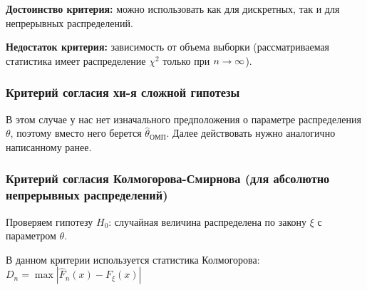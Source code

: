 \documentclass[11pt]{article}
\def\to{\mathchar"3221\nobreak\discretionary{}{\usefont{OMS}{cmsy}{m}{n}\char33}{}}
\begin{document}
\textbf{Достоинство критерия:} можно использовать как для дискретных,
так и для непрерывных распределений.

\textbf{Недостаток критерия:} зависимость от объема выборки
(рассматриваемая статистика имеет распределение \(\chi^2\) только при
\(n\to\infty\)).

\hypertarget{ux43aux440ux438ux442ux435ux440ux438ux439-ux441ux43eux433ux43bux430ux441ux438ux44f-ux445ux438-ux43aux432ux430ux434ux440ux430ux442-ux434ux43bux44f-ux441ux43bux43eux436ux43dux43eux439-ux433ux438ux43fux43eux442ux435ux437ux44b}{%
\subsubsection*{Критерий согласия хи-я сложной
гипотезы}\label{ux43aux440ux438ux442ux435ux440ux438ux439-ux441ux43eux433ux43bux430ux441ux438ux44f-ux445ux438-ux43aux432ux430ux434ux440ux430ux442-ux434ux43bux44f-ux441ux43bux43eux436ux43dux43eux439-ux433ux438ux43fux43eux442ux435ux437ux44b}}

В этом случае у нас нет изначального предположения о параметре
распределения \(\theta\), поэтому вместо него берется
\(\hat{\theta}_{ОМП}\). Далее действовать нужно аналогично написанному
ранее.

    \hypertarget{ux43aux440ux438ux442ux435ux440ux438ux439-ux441ux43eux433ux43bux430ux441ux438ux44f-ux43aux43eux43bux43cux43eux433ux43eux440ux43eux432ux430-ux441ux43cux438ux440ux43dux43eux432ux430-ux434ux43bux44f-ux430ux431ux441ux43eux43bux44eux442ux43dux43e-ux43dux435ux43fux440ux435ux440ux44bux432ux43dux44bux445-ux440ux430ux441ux43fux440ux435ux434ux435ux43bux435ux43dux438ux439}{%
\subsubsection*{Критерий согласия Колмогорова-Смирнова (для абсолютно
непрерывных
распределений)}\label{ux43aux440ux438ux442ux435ux440ux438ux439-ux441ux43eux433ux43bux430ux441ux438ux44f-ux43aux43eux43bux43cux43eux433ux43eux440ux43eux432ux430-ux441ux43cux438ux440ux43dux43eux432ux430-ux434ux43bux44f-ux430ux431ux441ux43eux43bux44eux442ux43dux43e-ux43dux435ux43fux440ux435ux440ux44bux432ux43dux44bux445-ux440ux430ux441ux43fux440ux435ux434ux435ux43bux435ux43dux438ux439}}

Проверяем гипотезу \(H_0\): случайная величина распределена по закону
\(\xi\) с параметром \(\theta\).

В данном критерии используется статистика Колмогорова:
\(D_n=\max{\left|\hat{F}_n(x)-F_{\xi}(x)\right|}\)
\end{document}
